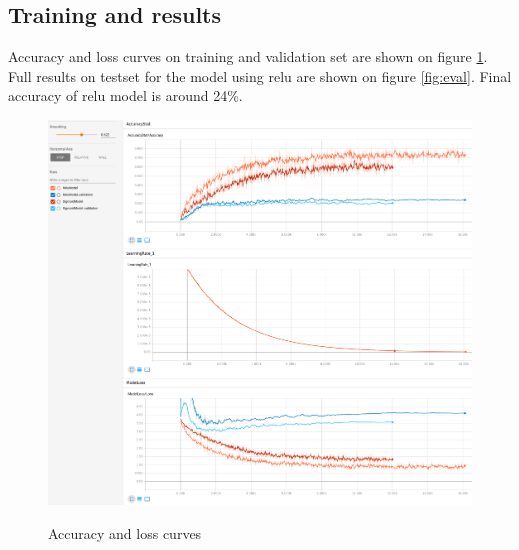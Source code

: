 \documentclass[a4paper]{article}
\begin{document}
\subsection{Training and results}
Accuracy and loss curves on training and validation set are shown on figure \ref{fig:training}.
Full results on testset for the model using relu are shown on figure \ref{fig:eval}.
Final accuracy of relu model is around 24\%.

\begin{figure}[H]
    \caption[]{Accuracy and loss curves}
    \centering
    \includegraphics[page=2,width=1.0\textwidth]{training.png}
    \label{fig:training}
\end{figure}
\end{document}

